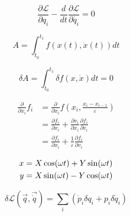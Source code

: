 $$
\frac{\partial \mathcal{L}}{\partial q_i} - \frac{d}{dt}\frac{\partial \mathcal{L}}{\partial \dot{q_i}} = 0
$$


$$ A = \int_{t_0}^{t_1} f(x(t), \dot{x}(t)) dt $$

$$
\delta A = \int_{t_0}^{t_1} \delta f(x, \dot{x})dt = 0
$$

\begin{align*}
    \frac{\partial}{\partial x_i} f_i &=
    \frac{\partial}{\partial x_i} f \left(x_i, \frac{x_i - x_{i-1}}{\varepsilon}\right) \\
    &= \frac{\partial f_i}{\partial x_i} + \frac{\partial v_i}{\partial x_i} \frac{\partial f_i}{\partial v_i} \\
    &= \frac{\partial f_i}{\partial x_i} + \frac{1}{\varepsilon} \frac{\partial f_i}{\partial v_i}
\end{align*}

\begin{align}
    x &= X \cos(\omega t) + Y \sin(\omega t) \notag \\
    y &= X \sin(\omega t) - Y \cos(\omega t) \label{eq:rotation}
\end{align}

$$
\delta \mathcal{L}(\vec{q}, \vec{\dot{q}}) = \sum_i \left( \dot{p}_i \delta q_i
+ p_i \delta \dot{q}_i \right)
$$
